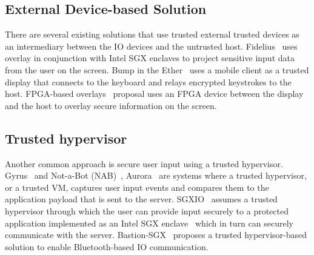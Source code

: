 \subsection{External Device-based Solution} There are several existing solutions that use trusted external trusted devices as an intermediary between the IO devices and the untrusted host. Fidelius~\cite{Fidelius} uses overlay in conjunction with Intel SGX enclaves to project sensitive input data from the user on the screen. Bump in the Ether~\cite{McCPerRei2006} uses a mobile client as a trusted display that connects to the keyboard and relays encrypted keystrokes to the host. FPGA-based overlays~\cite{brandon2017trusted} proposal uses an FPGA device between the display and the host to overlay secure information on the screen.


\subsection{Trusted hypervisor} Another common approach is secure user input using a trusted hypervisor. Gyrus~\cite{gyrus} and Not-a-Bot (NAB)~\cite{nab}, Aurora~\cite{liang2019establishing} are systems where a trusted hypervisor, or a trusted VM, captures user input events and compares them to the application payload that is sent to the server. SGXIO~\cite{weiser2017sgxio} assumes a trusted hypervisor through which the user can provide input securely to a protected application implemented as an Intel SGX enclave~\cite{sgx} which in turn can securely communicate with the server. Bastion-SGX~\cite{BASTION-SGX} proposes a trusted hypervisor-based solution to enable Bluetooth-based IO communication.

